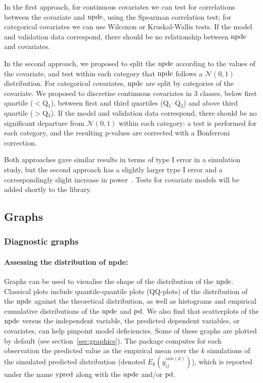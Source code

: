 In the first approach, for continuous covariates we can test for correlations between the covariate and ${\rm npde}$, using the Spearman correlation test; for categorical covariates we can use Wilcoxon or Kruskal-Wallis tests. If the model and validation data correspond, there should be no relationship between ${\rm npde}$ and covariates.

In the second approach, we proposed to split the ${\rm npde}$ according to the values of the covariate, and test within each category that ${\rm npde}$ follows a $\mathcal{N}(0,1)$ distribution. For categorical covariates, ${\rm npde}$ are split by categories of the covariate. We proposed to discretise continuous covariates in 3 classes, below first quartile ($<$Q$_1$), between first and third quartiles (Q$_1$--Q$_3$) and above third quartile ($>$Q$_3$). If the model and validation data correspond, there should be no significant departure from $\mathcal{N}(0,1)$ within each category: a test is performed for each category, and the resulting p-values are corrected with a Bonferroni correction.

Both approaches gave similar results in terms of type I error in a simulation study, but the second approach has a slightly larger type I error and a correspondingly slight increase in power~\cite{Brendel10}. Tests for covariate models will be added shortly to the library.

\subsection{Graphs} \label{sec:graphmethods}

\subsubsection{Diagnostic graphs} 

\paragraph{Assessing the distribution of npde:} Graphs can be used to visualise the shape of the distribution of the ${\rm npde}$. Classical plots include quantile-quantile plots (QQ-plots) of the distribution of the ${\rm npde}$ against the theoretical distribution, as well as  histograms and empirical cumulative distributions of the ${\rm npde}$ and ${\rm pd}$. We also find that scatterplots of the ${\rm npde}$ versus the independent variable, the predicted dependent variables, or covariates, can help pinpoint model deficiencies. Some of these graphs are plotted by default (see section~\ref{sec:graphics}). The package computes for each observation the predicted value as the empirical mean over the $k$ simulations of the simulated predicted distribution (denoted $E_k(y^{sim(k)}_{ij})$), which is reported under the name ${\rm ypred}$ along with the ${\rm npde}$ and/or ${\rm pd}$.

